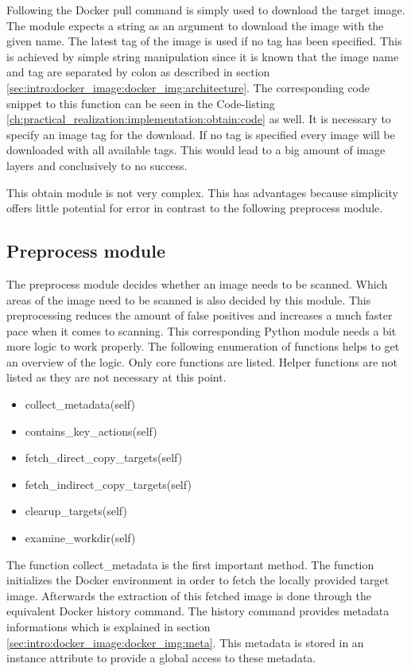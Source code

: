 Following the Docker pull command is simply used to download the target image. 
The module expects a string as an argument to download the image with the given name.
The latest tag of the image is used if no tag has been specified. 
This is achieved by simple string manipulation since it is known that the image name and tag are separated by colon as described in section \ref{sec:intro:docker_image:docker_img:architecture}.
The corresponding code snippet to this function can be seen in the Code-listing \ref{ch:practical_realization:implementation:obtain:code} as well.
It is necessary to specify an image tag for the download.
If no tag is specified every image will be downloaded with all available tags.
This would lead to a big amount of image layers and conclusively to no success.

This obtain module is not very complex. 
This has advantages because simplicity offers little potential for error in contrast to the following preprocess module.

\subsection{Preprocess module}
\label{ch:practical_realization:implementation:preprocessing}
The preprocess module decides whether an image needs to be scanned.
Which areas of the image need to be scanned is also decided by this module.
This preprocessing reduces the amount of false positives and increases a much faster pace when it comes to scanning.	
This corresponding Python module needs a bit more logic to work properly. 
The following enumeration of functions helps to get an overview of the logic. 
Only core functions are listed.
Helper functions are not listed as they are not necessary at this point.
\begin{itemize}
\item collect\_metadata(self)
\item contains\_key\_actions(self)
\item fetch\_direct\_copy\_targets(self)
\item fetch\_indirect\_copy\_targets(self)
\item clearup\_targets(self)
\item examine\_workdir(self)
\end{itemize}
The function collect\_metadata is the first important method. 
The function initializes the Docker environment in order to fetch the locally provided target image. 
Afterwards the extraction of this fetched image is done through the equivalent Docker history command. 
The history command provides metadata informations which is explained in section \ref{sec:intro:docker_image:docker_img:meta}. 
This metadata is stored in an instance attribute to provide a global access to these metadata.

